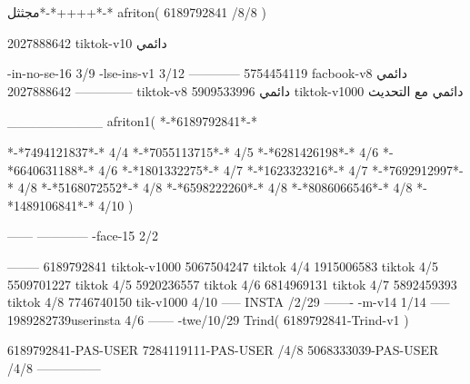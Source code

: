 مجثثل*-*++++*-*
afriton(
6189792841 /8/8
)

2027888642 tiktok-v10
دائمي

-in-no-se-16 3/9
-lse-ins-v1 3/12
------------
5754454119 facbook-v8
دائمي
--------------
2027888642 tiktok-v8
دائمي
5909533996 tiktok-v1000
دائمي مع التحديث

__________
afriton1(
*-*6189792841*-*

*-*7494121837*-* 4/4
*-*7055113715*-* 4/5
*-*6281426198*-* 4/6
*-*6640631188*-* 4/6
*-*1801332275*-* 4/7
*-*1623323216*-* 4/7
*-*7692912997*-* 4/8
*-*5168072552*-* 4/8
*-*6598222260*-* 4/8
*-*8086066546*-* 4/8
*-*1489106841*-* 4/10
)


------
------------
-face-15 2/2

--------
6189792841 tiktok-v1000
5067504247 tiktok 4/4
1915006583 tiktok 4/5
5509701227 tiktok 4/5
5920236557 tiktok 4/6
6814969131 tiktok 4/7
5892459393 tiktok 4/8
7746740150  tik-v1000 4/10
-----
 INSTA /2/29
-------
-m-v14 1/14
-----
1989282739userinsta 4/6
------
-twe/10/29
Trind(
6189792841-Trind-v1 
)

6189792841-PAS-USER
7284119111-PAS-USER /4/8
5068333039-PAS-USER /4/8
    ---------------
